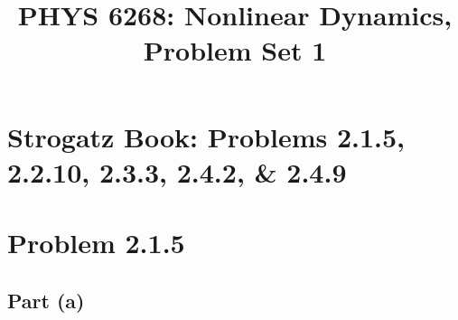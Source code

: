 \documentclass[draft]{agujournal2019}
\begin{document}
\SetSinglespace{}
\title{PHYS 6268: Nonlinear Dynamics, Problem Set 1}




\section*{Strogatz Book: Problems 2.1.5, 2.2.10, 2.3.3, 2.4.2, \& 2.4.9}


\section{Problem 2.1.5}
\label{sec:p1}


\subsection{Part (a)}
\label{subsec:p1a}
\end{document}
